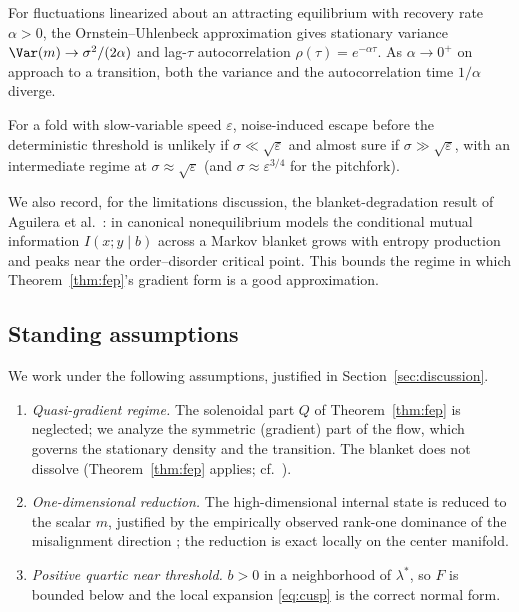 \begin{theorem}\label{thm:warning}
For fluctuations linearized about an attracting equilibrium with recovery rate $\alpha>0$, the
Ornstein--Uhlenbeck approximation gives stationary variance $\Var(m)\to\sigma^2/(2\alpha)$ and
lag-$\tau$ autocorrelation $\rho(\tau)=e^{-\alpha\tau}$. As $\alpha\to0^+$ on approach to a
transition, both the variance and the autocorrelation time $1/\alpha$ diverge.
\end{theorem}

\begin{theorem}\label{thm:noise}
For a fold with slow-variable speed $\varepsilon$, noise-induced escape before the
deterministic threshold is unlikely if $\sigma\ll\sqrt{\varepsilon}$ and almost sure if
$\sigma\gg\sqrt\varepsilon$, with an intermediate regime at $\sigma\approx\sqrt\varepsilon$
(and $\sigma\approx\varepsilon^{3/4}$ for the pitchfork).
\end{theorem}

We also record, for the limitations discussion, the blanket-degradation result of Aguilera et
al.~\cite{aguilera2022}: in canonical nonequilibrium models the conditional mutual information
$I(x;y\mid b)$ across a Markov blanket grows with entropy production and peaks near the
order--disorder critical point. This bounds the regime in which Theorem~\ref{thm:fep}'s gradient
form is a good approximation.

\subsection{Standing assumptions}

We work under the following assumptions, justified in Section~\ref{sec:discussion}.
\begin{enumerate}[label=(A\arabic*),leftmargin=*,itemsep=2pt,topsep=2pt]
  \item \emph{Quasi-gradient regime.} The solenoidal part $Q$ of Theorem~\ref{thm:fep} is
    neglected; we analyze the symmetric (gradient) part of the flow, which governs the
    stationary density and the transition. The blanket does not dissolve
    (Theorem~\ref{thm:fep} applies; cf.~\cite{aguilera2022}).
  \item \emph{One-dimensional reduction.} The high-dimensional internal state is reduced to the
    scalar $m$, justified by the empirically observed rank-one dominance of the misalignment
    direction \cite{nghiem2026trait,minder2026traces}; the reduction is exact locally on the
    center manifold.
  \item \emph{Positive quartic near threshold.} $b>0$ in a neighborhood of $\lambda^\ast$, so
    $F$ is bounded below and the local expansion \eqref{eq:cusp} is the correct normal form.
\end{enumerate}
